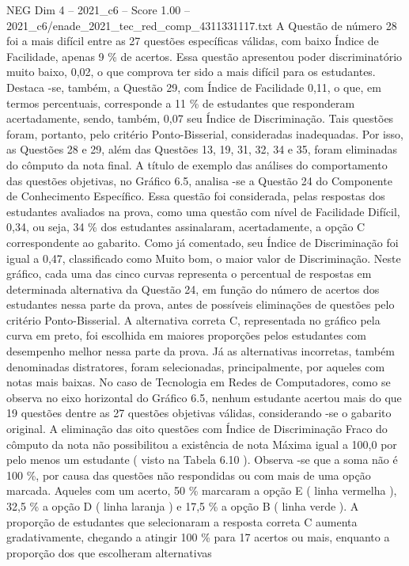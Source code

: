 \begin{textsample}{NEG Dim 4 – 2021\_c6 – Score 1.00 – 2021\_c6/enade\_2021\_tec\_red\_comp\_4311331117.txt}
A Questão de número 28 foi a mais difícil entre as 27 questões específicas válidas, com baixo Índice de Facilidade, apenas 9 \% de acertos.
Essa questão apresentou poder discriminatório muito baixo, 0,02, o que comprova ter sido a mais difícil para os estudantes.
Destaca -se, também, a Questão 29, com Índice de Facilidade 0,11, o que, em termos percentuais, corresponde a 11 \% de estudantes que responderam acertadamente, sendo, também, 0,07 seu Índice de Discriminação.
Tais questões foram, portanto, pelo critério Ponto-Bisserial, consideradas inadequadas.
Por isso, as Questões 28 e 29, além das Questões 13, 19, 31, 32, 34 e 35, foram eliminadas do cômputo da nota final.
A título de exemplo das análises do comportamento das questões objetivas, no Gráfico 6.5, analisa -se a Questão 24 do Componente de Conhecimento Específico.
Essa questão foi considerada, pelas respostas dos estudantes avaliados na prova, como uma questão com nível de Facilidade Difícil, 0,34, ou seja, 34 \% dos estudantes assinalaram, acertadamente, a opção C correspondente ao gabarito.
Como já comentado, seu Índice de Discriminação foi igual a 0,47, classificado como Muito bom, o maior valor de Discriminação.
Neste gráfico, cada uma das cinco curvas representa o percentual de respostas em determinada alternativa da Questão 24, em função do número de acertos dos estudantes nessa parte da prova, antes de possíveis eliminações de questões pelo critério Ponto-Bisserial.
A alternativa correta C, representada no gráfico pela curva em preto, foi escolhida em maiores proporções pelos estudantes com desempenho melhor nessa parte da prova.
Já as alternativas incorretas, também denominadas distratores, foram selecionadas, principalmente, por aqueles com notas mais baixas.
No caso de Tecnologia em Redes de Computadores, como se observa no eixo horizontal do Gráfico 6.5, nenhum estudante acertou mais do que 19 questões dentre as 27 questões objetivas válidas, considerando -se o gabarito original.
A eliminação das oito questões com Índice de Discriminação Fraco do cômputo da nota não possibilitou a existência de nota Máxima igual a 100,0 por pelo menos um estudante ( visto na Tabela 6.10 ).
Observa -se que a soma não é 100 \%, por causa das questões não respondidas ou com mais de uma opção marcada.
Aqueles com um acerto, 50 \% marcaram a opção E ( linha vermelha ), 32,5 \% a opção D ( linha laranja ) e 17,5 \% a opção B ( linha verde ).
A proporção de estudantes que selecionaram a resposta correta C aumenta gradativamente, chegando a atingir 100 \% para 17 acertos ou mais, enquanto a proporção dos que escolheram alternativas

\end{textsample}
